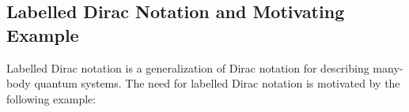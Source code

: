\subsection{Labelled Dirac Notation and Motivating Example}
Labelled Dirac notation is a generalization of Dirac notation for
describing many-body quantum systems. The need for labelled Dirac
notation is motivated by the following example:



